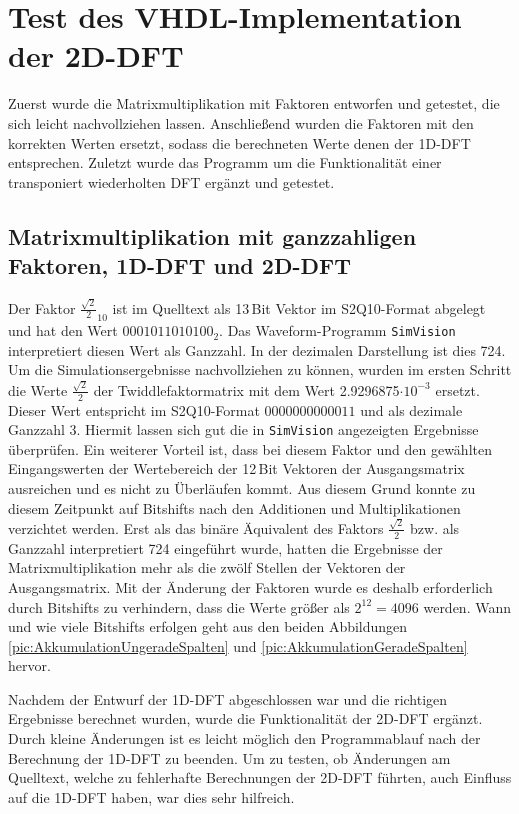 \section{Test des VHDL-Implementation der 2D-DFT}
Zuerst wurde die Matrixmultiplikation mit Faktoren entworfen und getestet, die sich leicht nachvollziehen lassen. Anschließend wurden die Faktoren 
mit den korrekten Werten ersetzt, sodass die berechneten Werte denen der 1D-DFT entsprechen. Zuletzt wurde das Programm um die Funktionalität 
einer transponiert wiederholten DFT ergänzt und getestet.

\subsection{Matrixmultiplikation mit ganzzahligen Faktoren, 1D-DFT und 2D-DFT}
Der Faktor $\frac{\sqrt{2}}{2}_{10}$ ist im Quelltext als 13\,Bit Vektor im S2Q10-Format abgelegt und hat den Wert $0001011010100_2$.
Das Waveform-Programm \texttt{SimVision} interpretiert diesen Wert als Ganzzahl. In der dezimalen Darstellung ist dies 724.
Um die Simulationsergebnisse nachvollziehen zu können, wurden im ersten Schritt die Werte  $\frac{\sqrt{2}}{2}$ der 
Twiddlefaktormatrix mit dem Wert \num{2.9296875}$\cdot10^{-3}$ ersetzt. Dieser Wert entspricht im S2Q10-Format $0000000000011$ und als
dezimale Ganzzahl 3. Hiermit lassen sich gut die in \texttt{SimVision} angezeigten Ergebnisse überprüfen.
Ein weiterer Vorteil ist, dass bei diesem Faktor und den gewählten Eingangswerten der Wertebereich der 12\,Bit Vektoren der Ausgangsmatrix ausreichen und es nicht zu Überläufen kommt.
Aus diesem Grund konnte zu diesem Zeitpunkt auf Bitshifts nach den Additionen und Multiplikationen verzichtet werden.
Erst als das binäre Äquivalent des Faktors $\frac{\sqrt{2}}{2}$ bzw. als Ganzzahl interpretiert 724 eingeführt wurde, hatten die Ergebnisse der Matrixmultiplikation mehr als die zwölf Stellen der Vektoren der Ausgangsmatrix.
Mit der Änderung der Faktoren wurde es deshalb erforderlich durch Bitshifts zu verhindern, dass die Werte größer als $2^{12}=4096$ werden.
Wann und wie viele Bitshifts erfolgen geht aus den beiden Abbildungen \ref{pic:AkkumulationUngeradeSpalten} und \ref{pic:AkkumulationGeradeSpalten} hervor.

Nachdem der Entwurf der 1D-DFT abgeschlossen war und die richtigen Ergebnisse berechnet wurden, wurde die Funktionalität der 2D-DFT ergänzt. 
Durch kleine Änderungen ist es leicht möglich den Programmablauf nach der Berechnung
der 1D-DFT zu beenden. 
Um zu testen, ob Änderungen am Quelltext, welche zu fehlerhafte Berechnungen der 2D-DFT führten, auch Einfluss auf die 1D-DFT haben, war dies sehr hilfreich.

